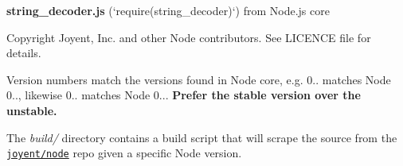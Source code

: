 {\bfseries string\+\_\+decoder.\+js} (`require(\textquotesingle{}string\+\_\+decoder\textquotesingle{})`) from Node.\+js core

Copyright Joyent, Inc. and other Node contributors. See L\+I\+C\+E\+N\+CE file for details.

Version numbers match the versions found in Node core, e.\+g. 0.. matches Node 0.., likewise 0.. matches Node 0... {\bfseries Prefer the stable version over the unstable.}

The {\itshape build/} directory contains a build script that will scrape the source from the \href{https://github.com/joyent/node}{\tt joyent/node} repo given a specific Node version. 